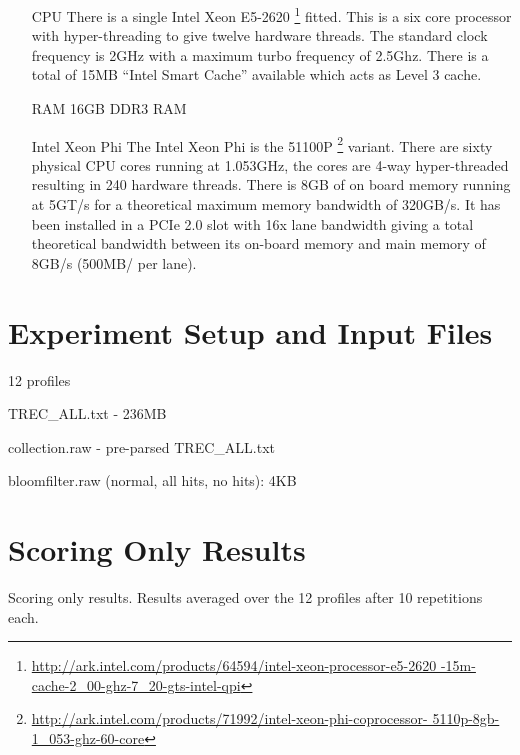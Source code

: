 \begin{itemize}

\item[CPU] There is a single Intel Xeon E5-2620
\footnote{\url{http://ark.intel.com/products/64594/intel-xeon-processor-e5-2620
-15m-cache-2_00-ghz-7_20-gts-intel-qpi}} fitted. This is a six core processor
with hyper-threading to give twelve hardware threads. The standard clock
frequency is 2GHz with a maximum turbo frequency of 2.5Ghz. There is a total of
15MB ``Intel Smart Cache'' available which acts as Level 3 cache.

\item[RAM] 16GB DDR3 RAM

\item[Intel Xeon Phi] The Intel Xeon Phi is the 51100P
\footnote{\url{http://ark.intel.com/products/71992/intel-xeon-phi-coprocessor-
5110p-8gb-1_053-ghz-60-core}} variant. There are sixty physical CPU cores
running at 1.053GHz, the cores are 4-way hyper-threaded resulting in 240
hardware threads. There is 8GB of on board memory running at 5GT/s for a
theoretical maximum memory bandwidth of 320GB/s. It has been installed in a PCIe
2.0 slot with 16x lane bandwidth giving a total theoretical bandwidth between
its on-board memory and main memory of 8GB/s (500MB/ per lane).

\end{itemize}

\section{Experiment Setup and Input Files}

12 profiles

TREC\_ALL.txt - 236MB

collection.raw - pre-parsed TREC\_ALL.txt

bloomfilter.raw (normal, all hits, no hits): 4KB

\section{Scoring Only Results}

Scoring only results. Results averaged over the 12 profiles after 10 repetitions
each.

